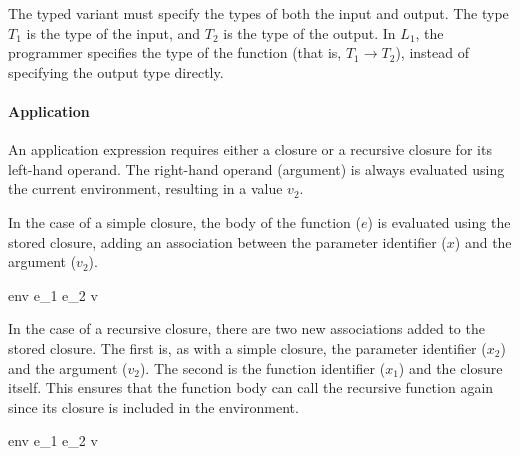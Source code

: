 \documentclass{article}
\begin{document}
The typed variant must specify the types of both the input and output.
The type $T_1$ is the type of the input, and $T_2$ is the type of the output.
In $L_1$, the programmer specifies the type of the function (that is, $T_1 \rightarrow T_2$), instead of specifying the output type directly.
    

    
\paragraph{Application}
An application expression requires either a closure or a recursive closure for its left-hand operand.
The right-hand operand (argument) is always evaluated using the current environment, resulting in a value $v_2$.

\smallskip

In the case of a simple closure, the body of the function ($e$) is evaluated using the stored closure, 
adding an association between the parameter identifier ($x$) and the argument ($v_2$).

    {\mbox{env} \vdash e_1 \; e_2 \Downarrow v}
    
In the case of a recursive closure, there are two new associations added to the stored closure.
The first is, as with a simple closure, the parameter identifier ($x_2$) and the argument ($v_2$).
The second is the function identifier ($x_1$) and the closure itself.
This ensures that the function body can call the recursive function again since its closure is included in the environment.

    {\mbox{env} \vdash e_1 \; e_2 \Downarrow v}
        
\end{document}
